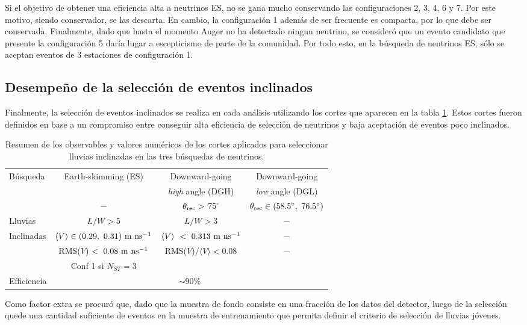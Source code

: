 		Si el objetivo de obtener una eficiencia alta a neutrinos ES, no se gana mucho conservando las configuraciones 2, 3, 4, 6 y 7. Por este motivo, siendo conservador, se las descarta.
		En cambio, la configuración 1 además de ser frecuente es compacta, por lo que debe ser conservada.
		Finalmente, dado que hasta el momento Auger no ha detectado ningun neutrino, se consideró que un evento candidato que presente la configuración 5 daría lugar a escepticismo de parte de la comunidad. Por todo esto, en la búsqueda de neutrinos ES, sólo se aceptan eventos de 3 estaciones de configuración 1.
		
		\subsection{Desempeño de la selección de eventos inclinados}
		
		Finalmente, la selección de eventos inclinados se realiza en cada análisis utilizando los cortes que aparecen en la tabla \ref{tab:inclSel}.
		Estos cortes fueron definidos en base a un compromiso entre conseguir alta eficiencia de selección de neutrinos y baja aceptación de eventos poco inclinados.
		\begin{table}[ht!]
		\begin{center}
			\renewcommand{\arraystretch}{1.4}
			\scriptsize
			\begin{tabular}{|l|c|c|c|}
			\hline
			Búsqueda & Earth-skimming (ES)           & Downward-going                        & Downward-going                       \\
					&                               & {\it high} angle (DGH)                & {\it low} angle (DGL)                \\
			\hline
						& $-$                             & $\theta_{\rm rec}>$ 75$^{\circ}$   &   $\theta_{\rm rec}\in (58.5^\circ,~76.5^{\circ})$\\
			Lluvias    & $L/W > 5$                                         & $L/W > 3$ & $-$ \\
			Inclinadas & $\langle V\rangle\in (0.29,~0.31)~{\rm m~ns^{-1}}$ & $\langle V \rangle~<~0.313~{\rm m~ns^{-1}}$ & $-$ \\
					& RMS($V$)$~<~0.08~{\rm m~ns^{-1}}$                 & RMS($V$)/$\langle V\rangle<0.08$ & $-$ \\
					& Conf 1 si $N_{ST}=3$ & & \\
			\hline
			Efficiencia & \multicolumn{3}{c|}{$\sim90\%$}\\
			\hline
			\end{tabular}
			\vskip -3mm
			\caption{\label{tab:inclSel}Resumen de los observables y valores numéricos de los cortes aplicados para seleccionar lluvias inclinadas en las tres búsquedas de neutrinos.} 
		\end{center}
		\end{table}
		Como factor extra se procur\'o que, dado que la muestra de fondo consiste en una fracción de los datos del detector, luego de la selección quede una cantidad suficiente de eventos en la muestra de entrenamiento que permita definir el criterio de selección de lluvias jóvenes.
		
